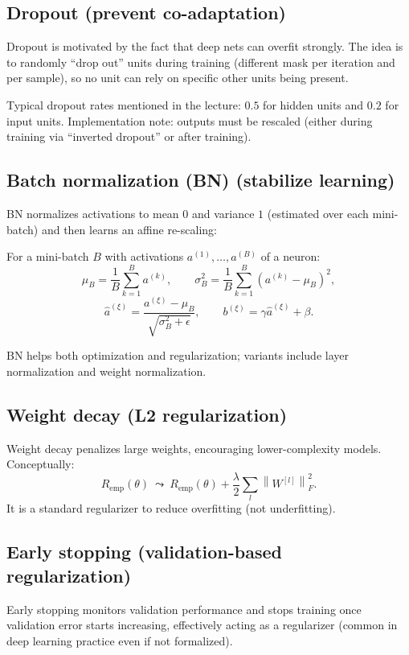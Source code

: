 \documentclass[11pt, oneside]{book}
\newcommand{\norm}[1]{\left\lVert #1 \right\rVert}
\newcommand{\1}{\ind}                       %
\begin{document}
\subsection{Dropout (prevent co-adaptation)}
Dropout is motivated by the fact that deep nets can overfit strongly. The idea is to randomly ``drop out'' units during training (different mask per iteration and per sample), so no unit can rely on specific other units being present.

Typical dropout rates mentioned in the lecture: $0.5$ for hidden units and $0.2$ for input units.
Implementation note: outputs must be rescaled (either during training via ``inverted dropout'' or after training).

\subsection{Batch normalization (BN) (stabilize learning)}
BN normalizes activations to mean $0$ and variance $1$ (estimated over each mini-batch) and then learns an affine re-scaling:
\begin{thmbox}[title={Batch Normalization}]
For a mini-batch $B$ with activations $a^{(1)},\dots,a^{(B)}$ of a neuron:
\[
\mu_B=\frac{1}{B}\sum_{k=1}^{B}a^{(k)},\qquad
\sigma_B^2=\frac{1}{B}\sum_{k=1}^{B}(a^{(k)}-\mu_B)^2,
\]
\[
\hat a^{(\xi)}=\frac{a^{(\xi)}-\mu_B}{\sqrt{\sigma_B^2+\epsilon}},\qquad
b^{(\xi)}=\gamma \hat a^{(\xi)}+\beta.
\]
\end{thmbox}
BN helps both optimization and regularization; variants include layer normalization and weight normalization.

\subsection{Weight decay (L2 regularization)}
Weight decay penalizes large weights, encouraging lower-complexity models. Conceptually:
\[
  R_{\mathrm{emp}}(\theta)\ \leadsto\ R_{\mathrm{emp}}(\theta) + \frac{\lambda}{2}\sum_l \norm{W^{[l]}}_F^2.
\]
It is a standard regularizer to reduce overfitting (not underfitting).

\subsection{Early stopping (validation-based regularization)}
Early stopping monitors validation performance and stops training once validation error starts increasing, effectively acting as a regularizer (common in deep learning practice even if not formalized).
\end{document}
